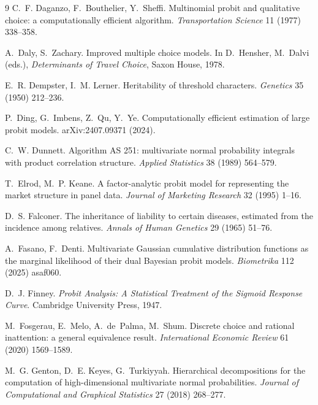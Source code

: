 \documentclass[12pt]{article}
\theoremstyle{remark}
\begin{document}
\begin{thebibliography}{9}
 C.~F. Daganzo, F.~Bouthelier, Y.~Sheffi.
Multinomial probit and qualitative choice: a computationally efficient
algorithm. \emph{Transportation Science} 11 (1977) 338--358.

 A.~Daly, S.~Zachary.
Improved multiple choice models. In D.~Hensher, M.~Dalvi (eds.),
\emph{Determinants of Travel Choice}, Saxon House, 1978.

 E.~R. Dempster,
I.~M. Lerner. Heritability of threshold characters. \emph{Genetics} 35
(1950) 212--236.

 P.~Ding,
G.~Imbens, Z.~Qu, Y.~Ye. Computationally efficient estimation of large
probit models. arXiv:2407.09371 (2024).

 C.~W. Dunnett. Algorithm AS 251:
multivariate normal probability integrals with product correlation
structure. \emph{Applied Statistics} 38 (1989) 564--579.

 T.~Elrod, M.~P. Keane. A factor-analytic probit model for
representing the market structure in panel data. \emph{Journal of Marketing
Research} 32 (1995) 1--16.

 D.~S. Falconer. The inheritance
of liability to certain diseases, estimated from the incidence among
relatives. \emph{Annals of Human Genetics} 29 (1965) 51--76.

 A.~Fasano, F.~Denti. Multivariate Gaussian
cumulative distribution functions as the marginal likelihood of their
dual Bayesian probit models. \emph{Biometrika} 112 (2025) asaf060.

 D.~J. Finney. \emph{Probit
Analysis: A Statistical Treatment of the Sigmoid Response Curve}.
Cambridge University Press, 1947.

 M.~Fosgerau, E.~Melo, A.~de~Palma, M.~Shum. Discrete
choice and rational inattention: a general equivalence result.
\emph{International Economic Review} 61 (2020) 1569--1589.

M.~G. Genton, D.~E. Keyes, G.~Turkiyyah. Hierarchical decompositions for
the computation of high-dimensional multivariate normal probabilities.
\emph{Journal of Computational and Graphical Statistics} 27 (2018)
268--277.


\end{thebibliography}
\end{document}
